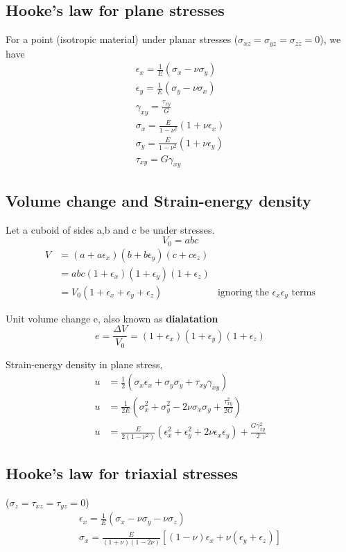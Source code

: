 \documentclass{article}
\begin{document}
	\subsection{Hooke's law for plane stresses }
	For a point (isotropic material) under planar stresses ($\sigma_{xz}=\sigma_{yz}=\sigma_{zz} =0$), we have
	\begin{gather*}
		\epsilon_x = \frac{1}{E} (\sigma_x - \nu \sigma_y)\\
		\epsilon_y = \frac{1}{E} (\sigma_y - \nu \sigma_x)\\
		\gamma_{xy} = \frac{\tau_{xy}}{G}\\
		\sigma_x = \frac{E}{1-\nu^2} (1+\nu \epsilon_x)\\
		\sigma_y = \frac{E}{1-\nu^2} (1+\nu \epsilon_y)\\
		\tau_{xy} = G \gamma_{xy}
	\end{gather*}



	\subsection{Volume change and Strain-energy density}
		Let a cuboid of sides a,b and c be under stresses. 
		\[V_0 = abc\]
		\begin{align*}
		V &= (a+a\epsilon_x) (b+b\epsilon_y)  (c+c\epsilon_z)\\
		  &= abc(1+\epsilon_x) (1+\epsilon_y)  (1+\epsilon_z)\\ 
		  &= V_0 (1+\epsilon_x +\epsilon_y + \epsilon_z ) &\text{ignoring the $\epsilon_x\epsilon_y$ terms}
		\end{align*}

		Unit volume change e, also known as \textbf{dialatation}\\
		\[e=\frac{\Delta V}{V_0} = (1+\epsilon_x) (1+\epsilon_y)  (1+\epsilon_z)\]

		Strain-energy density in plane stress,
		\begin{align*}
			u &= \frac{1}{2}(\sigma_x\epsilon_x + \sigma_y \sigma_y + \tau_{xy} \gamma_{xy})\\
			u &= \frac{1}{2E} (\sigma_x^2 +\sigma_y^2 - 2 \nu \sigma_x \sigma_y +\frac{\tau_{xy}^2}{2G})\\
			u &= \frac{E}{2(1-\nu^2)}(\epsilon_x^2 +\epsilon_y^2 +2\nu\epsilon_x \epsilon_y)+\frac{G\gamma_{xy}^2}{2}
		\end{align*}
	\subsection{Hooke's law for triaxial stresses}
	($\sigma_z=\tau_{xz}=\tau_{yz}=0$)
	\begin{gather*}
		\epsilon_x = \frac{1}{E}(\sigma_x -\nu \sigma_y -\nu \sigma_z)\\
		\sigma_x = \frac{E}{(1+\nu)(1-2\nu)}[(1-\nu)\epsilon_x + \nu (\epsilon_y+\epsilon_z)]
	\end{gather*}
\end{document}
